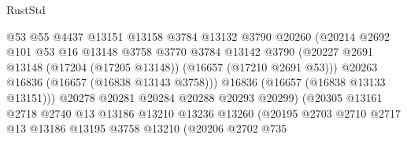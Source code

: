 \begin{lexlean}{RustStd}
\begin{coremodule}
                                      @53
                                      @55
                                      @4437
                                      @13151
                                      @13158
                                      @3784
                                      @13132
                                      @3790
                                      @20260
                                      (@20214
                                        @2692
                                        @101
                                        @53
                                        @16
                                        @13148
                                        @3758
                                        @3770
                                        @3784
                                        @13142
                                        @3790
                                        (@20227
                                          @2691
                                          @13148
                                          (@17204 (@17205 @13148))
                                          (@16657 (@17210 @2691 @53)))
                                        @20263
                                        @16836
                                        (@16657 (@16838 @13143 @3758)))
                                      @16836
                                      (@16657 (@16838 @13133 @13151)))
                                    @20278
                                    @20281
                                    @20284
                                    @20288
                                    @20293
                                    @20299)
                                  (@20305
                                    @13161
                                    @2718
                                    @2740
                                    @13
                                    @13186
                                    @13210
                                    @13236
                                    @13260
                                    (@20195
                                      @2703
                                      @2710
                                      @2717
                                      @13
                                      @13186
                                      @13195
                                      @3758
                                      @13210
                                      (@20206
                                        @2702
                                        @735

\end{coremodule}
\end{lexlean}
